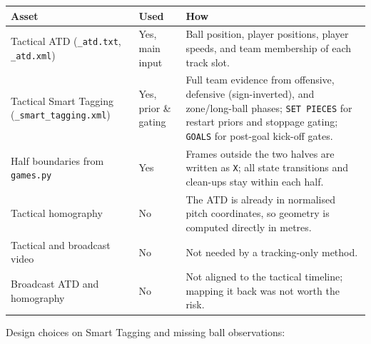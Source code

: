 \documentclass[11pt,a4paper]{article}
\newcommand{\code}[1]{\texttt{#1}}
\begin{document}
\begin{center}
\begin{tabularx}{\textwidth}{@{}>{\raggedright\arraybackslash}p{4.6cm} >{\raggedright\arraybackslash}p{2.6cm} Y@{}}
\toprule
\textbf{Asset} & \textbf{Used} & \textbf{How} \\
\midrule
Tactical ATD (\code{\_atd.txt}, \code{\_atd.xml}) & Yes, main input &
  Ball position, player positions, player speeds, and team membership of each track slot. \\
Tactical Smart Tagging (\code{\_smart\_tagging.xml}) & Yes, prior \& gating &
  Full team evidence from offensive, defensive (sign-inverted), and zone/long-ball phases;
  \code{SET PIECES} for restart priors and stoppage gating; \code{GOALS} for post-goal kick-off gates. \\
Half boundaries from \code{games.py} & Yes &
  Frames outside the two halves are written as \code{X}; all state transitions and clean-ups stay within each half. \\
Tactical homography & No &
  The ATD is already in normalised pitch coordinates, so geometry is computed directly in metres. \\
Tactical and broadcast video & No & Not needed by a tracking-only method. \\
Broadcast ATD and homography & No &
  Not aligned to the tactical timeline; mapping it back was not worth the risk. \\
\bottomrule
\end{tabularx}
\end{center}

Design choices on Smart Tagging and missing ball observations:
\end{document}
